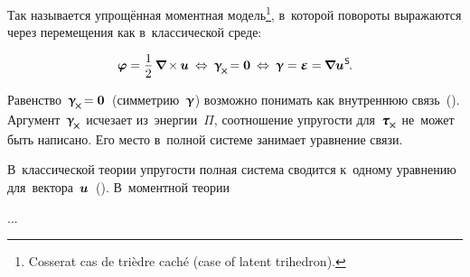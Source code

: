 \begin{otherlanguage}{russian}

Так называется упрощённая моментная модель\footnote{Cosserat  cas de trièdre caché (case of latent trihedron).}\hspace{-0.32em},\hspace{0.24em} в~которой повороты выражаются через перемещения как в~классической среде: %

\nopagebreak\vspace{-0.1em}\begin{equation}
\fieldofrotations = \displaystyle \onehalf \hspace{0.4ex} \boldnabla \hspace{-0.16ex} \times \hspace{-0.1ex} \fieldofdisplacements
\:\Leftrightarrow\:
\distortiontensor_{\hspace{-0.25ex}\Xcompanion} \hspace{-0.32ex} = \bm{0}
\:\Leftrightarrow\:
\distortiontensor = \mathboldepsilon = \hspace{-0.12ex} \boldnabla {\fieldofdisplacements}^{\hspace{0.1ex}\mathsf{S}} \hspace{-0.25ex}.
\end{equation}

Равенство~${\distortiontensor_{\hspace{-0.25ex}\Xcompanion} \hspace{-0.32ex} = \bm{0}}$~(симметрию~$\bm{\upgamma}$) возможно понимать как внутреннюю связь~(). Аргумент~${\distortiontensor_{\hspace{-0.25ex}\Xcompanion}}$ исчезает из~энергии~$\Pi$, соотношение упругости для~${\forcestresstensor_{\hspace{-0.1ex}\Xcompanion}}$ не~может быть написано. Его место в~полной системе занимает уравнение связи.

В~классической теории упругости полная система сводится к~одному уравнению для~вектора~$\bm{u}$~(). В~моментной теории

...



\end{otherlanguage}

